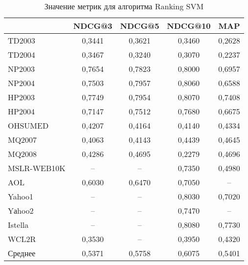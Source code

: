 \begin{table}[!ht]
	\begin{center}
		\begin{threeparttable}
			\captionsetup{justification=raggedright,singlelinecheck=off}
			\caption{Значение метрик для алгоритма Ranking SVM}
			\label{tbl:RSVMM}
			\begin{tabular}{|l|c|c|c|c|}
				\hline
				\makecell[c]{Датасет}  & NDCG@3 & NDCG@5 & NDCG@10 & MAP \\\hline
				TD2003&	0,3441&	0,3621&	0,3460&	0,2628\\\hline
				TD2004&	0,3467&	0,3240&	0,3070&	0,2237\\\hline
				NP2003&	0,7654&	0,7823&	0,8000&	0,6957\\\hline
				NP2004&	0,7503&	0,7957&	0,8060&	0,6588\\\hline
				HP2003&	0,7749&	0,7954&	0,8070&	0,7408\\\hline
				HP2004&	0,7147&	0,7512&	0,7680&	0,6675\\\hline
				OHSUMED&	0,4207&	0,4164&	0,4140&	0,4334\\\hline
				MQ2007&	0,4063&	0,4143&	0,4439&	0,4645\\\hline
				MQ2008&	0,4286&	0,4695&	0,2279&	0,4696\\\hline
				MSLR-WEB10K&	--&	--&	0,7350&	0,4980\\\hline
				AOL&	0,6030&	0,6470&	0,7050&	--\\\hline
				Yahoo1&	--&	--&	0,8030&	0,7020\\\hline
				Yаhoo2&	--&	--&	0,7470&	--\\\hline
				Istella&	--&	--&	0,8080&	0,7730\\\hline
				WCL2R&	0,3530&	--&	0,3950&	0,4320\\\hline
				Среднее& 0,5371&	0,5758&	0,6075&	0,5401\\\hline
			\end{tabular}
		\end{threeparttable}
	\end{center}
\end{table}


